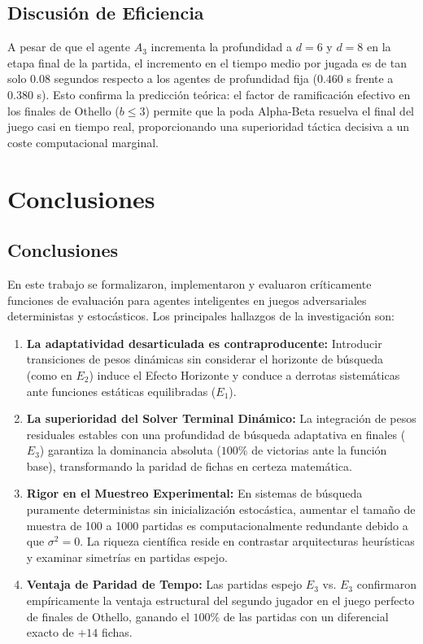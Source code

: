 \documentclass[10pt,a4paper]{article}
\begin{document}
\subsection{Discusión de Eficiencia}
A pesar de que el agente $A_3$ incrementa la profundidad a $d=6$ y $d=8$ en la etapa final de la partida, el incremento en el tiempo medio por jugada es de tan solo $0.08$ segundos respecto a los agentes de profundidad fija ($0.460$ s frente a $0.380$ s). Esto confirma la predicción teórica: el factor de ramificación efectivo en los finales de Othello ($b \le 3$) permite que la poda Alpha-Beta resuelva el final del juego casi en tiempo real, proporcionando una superioridad táctica decisiva a un coste computacional marginal.

\section{Conclusiones}

\subsection{Conclusiones}
En este trabajo se formalizaron, implementaron y evaluaron críticamente funciones de evaluación para agentes inteligentes en juegos adversariales deterministas y estocásticos. Los principales hallazgos de la investigación son:
\begin{enumerate}
    \item \textbf{La adaptatividad desarticulada es contraproducente:} Introducir transiciones de pesos dinámicas sin considerar el horizonte de búsqueda (como en $E_2$) induce el Efecto Horizonte y conduce a derrotas sistemáticas ante funciones estáticas equilibradas ($E_1$).
    \item \textbf{La superioridad del Solver Terminal Dinámico:} La integración de pesos residuales estables con una profundidad de búsqueda adaptativa en finales ($E_3$) garantiza la dominancia absoluta ($100\%$ de victorias ante la función base), transformando la paridad de fichas en certeza matemática.
    \item \textbf{Rigor en el Muestreo Experimental:} En sistemas de búsqueda puramente deterministas sin inicialización estocástica, aumentar el tamaño de muestra de 100 a 1000 partidas es computacionalmente redundante debido a que $\sigma^2 = 0$. La riqueza científica reside en contrastar arquitecturas heurísticas y examinar simetrías en partidas espejo.
    \item \textbf{Ventaja de Paridad de Tempo:} Las partidas espejo $E_3$ vs. $E_3$ confirmaron empíricamente la ventaja estructural del segundo jugador en el juego perfecto de finales de Othello, ganando el $100\%$ de las partidas con un diferencial exacto de $+14$ fichas.
\end{enumerate}
\end{document}
